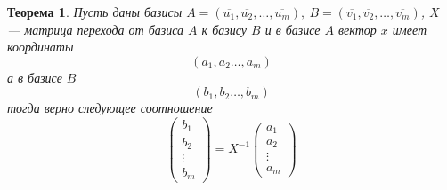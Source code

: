 \documentclass[]{article}
\theoremstyle{theorem}
\newtheorem{thr}{Теорема}
\theoremstyle{definition}
\begin{document}
\begin{thr}
	Пусть даны базисы
	$A=(\overline{u_1},\overline{u_2},\ldots, \overline{u_m}),\  B=(\overline{v_1},\overline{v_2},\ldots, \overline{v_m})$, $X$ --- матрица перехода от базиса $A$ к базису $B$ и в базисе $A$ вектор $x$ имеет координаты
	\begin{equation*}
		(a_1, a_2\ldots, a_m)
	\end{equation*}
	а в базисе $B$
	\begin{equation*}
		(b_1, b_2\ldots, b_m)
	\end{equation*}
	тогда верно следующее соотношение
\begin{equation}\label{eq7}
\begin{pmatrix}
	b_1
	\\
	b_2
	\\
	\vdots
	\\
	b_m
\end{pmatrix}
=
	X^{-1}
	\begin{pmatrix}
		a_1
		\\
		a_2
		\\
		\vdots
		\\
		a_m
	\end{pmatrix}
\end{equation}
\end{thr}
\end{document}
